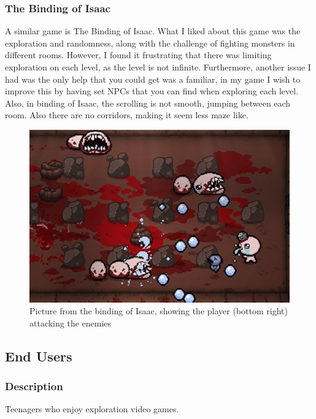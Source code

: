 \documentclass{article}
\begin{document}
            \subsubsection{The Binding of Isaac}
                A similar game is The Binding of Isaac. What I liked about this game was the exploration and randomness, along with the challenge of fighting monsters in different rooms. However, I found it frustrating that there was limiting exploration on each level, as the level is not infinite. Furthermore, another issue I had was the only help that you could get was a familiar, in my game I wish to improve this by having set NPCs that you can find when exploring each level. Also, in binding of Isaac, the scrolling is  not smooth, jumping between each room. Also there are no corridors, making it seem less maze like.
                \begin{figure}[hbt!]
                    \centerline{\includegraphics[scale=0.3]{img/The Binding of Isaac.jpg}}
                    \caption{Picture from the binding of Isaac, showing the player (bottom right) attacking the enemies}
                \end{figure}
        \subsection{End Users}
            \subsubsection{\textbf{Description}}
                Teenagers who enjoy exploration video games.
\end{document}
